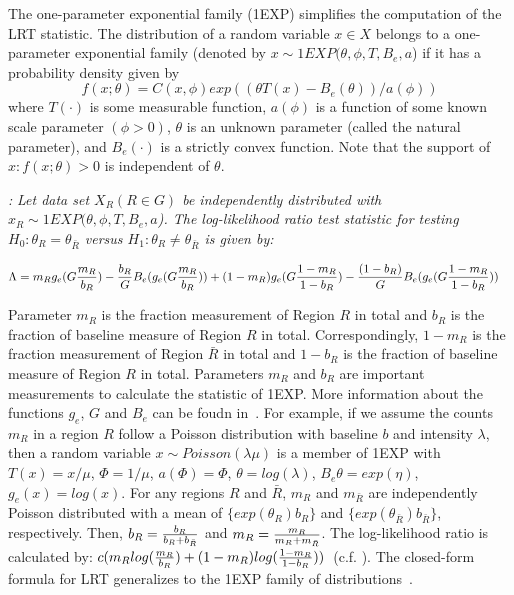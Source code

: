 \documentclass[AMA,LATO1COL]{WileyNJD-v2-bak}
\begin{document}
The one-parameter exponential family (1EXP) simplifies the computation of the LRT statistic. The distribution of a random variable $x\in X$ belongs to a one-parameter exponential family \cite{DagMaxmize} (denoted by $x\sim 1EXP(\theta,\phi,T,B_e,a$) if it has a probability density given by
\begin{equation}
f(x; \theta )=C(x,\phi)exp((\theta T(x)-B_e(\theta))/a(\phi))
\label{oneexp}
\end{equation}
where  $T(\cdot)$ is some measurable function, $a(\phi)$ is a function of some known scale parameter $(\phi>0)$, $\theta$ is an unknown parameter (called the natural parameter), and $B_e(\cdot)$ is a strictly convex function. Note that the support of ${x:f(x;\theta)>0}$ is independent of $\theta$.
\begin{theorem}\label{thm1}
{\it\cite{DagMaxmize}:}
{\it Let data set $X_R (R\in G)$ be independently distributed with $x_R\sim 1EXP(\theta,\phi,T,B_e,a$). The log-likelihood ratio test statistic for testing $H_{0}: \theta_R = \theta_{\bar R}$ versus $H_{1}: \theta_R \neq \theta_{\bar R}$ is given by:}

\begin{eqnarray}
\Lambda&={m_R}g_e({G{m_R\over b_R}})-{b_R\over G} {B_e(g_e(G{m_R\over b_R}))} +(1-m_R)g_e({G{1-m_R\over {1-b_R}}})-{(1-b_R)\over G}{B_e(g_e({G{1-m_R\over {1-b_R}}}))}
\label{eq}
\end{eqnarray}
\label{thm1}
\end{theorem}
Parameter $m_R$ is the fraction measurement of Region $R$ in total and $b_R$ is the fraction of baseline measure of Region $R$ in total. Correspondingly, $1-m_R$ is the fraction measurement of Region $\bar R$ in total and $1-b_R$ is the fraction of baseline measure of Region $R$ in total. Parameters $m_R$  and $b_R$ are important measurements to calculate the statistic of 1EXP. More information about the functions $g_e$, $G$ and $B_e$ can be foudn in~\cite{DagMaxmize}.
For example, if we assume the counts $m_R$ in a region $R$ follow a Poisson distribution with baseline $b$ and intensity $\lambda$, then a random variable $x \sim Poisson(\lambda \mu)$ is a member of 1EXP with $T(x)=x/\mu$, $\Phi=1/\mu$, $a(\Phi)=\Phi$, $\theta=log(\lambda)$, $B_e{\theta}=exp(\eta)$, $g_e{(x)}=log(x)$. For any regions $R$ and $\bar R$, $m_R$ and $m_{\bar R}$ are independently Poisson distributed with a mean of $\{exp(\theta_R)b_R\}$ and $\{exp(\theta_{\bar R})b_{\bar R}\}$, respectively. Then, $b_R={b_R\over {b_R+b_{\bar R}}}$ and $m_R={m_R\over {m_R+m_{\bar R}}}$. The log-likelihood ratio is calculated by: $c(m_R log ({m_R\over {b_R}})+ (1-m_R)log({{1-m_R}\over {1-b_R} }))$~(c.f. \cite{DagMaxmize}). The closed-form formula for LRT generalizes to the 1EXP family of distributions~\cite{DagMaxmize}.
\end{document}
